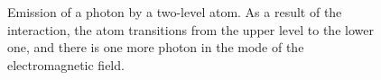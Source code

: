 \begin{figure}
\centering



\caption{Emission of a photon by a two-level atom. As a result of the
  interaction, the atom transitions from the upper level to the lower one, and
  there is one more photon in the mode of the electromagnetic field.}
\label{figPart1Ch2_4}
\end{figure}